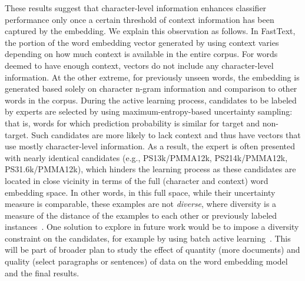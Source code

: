 These results suggest that character-level information enhances classifier performance only once a certain threshold of context information has been captured by the embedding.
We explain this observation as follows. 
In FastText, the portion of the word embedding vector generated by using context varies depending on how much context is available in the entire corpus. 
For words deemed to have enough context, vectors do not include any character-level information. 
At the other extreme, for previously unseen words, the embedding is generated based solely on character n-gram information and comparison to other words in the corpus.
During the active learning process, candidates to be labeled by experts are selected by using maximum-entropy-based uncertainty sampling: that is, words for which prediction probability is similar for target and non-target.
Such candidates are more likely to lack context
and thus have vectors that use mostly character-level information.
As a result, the expert is often presented with nearly identical candidates (e.g., PS13k/PMMA12k, PS214k/PMMA12k, PS31.6k/PMMA12k), which hinders the learning process as these candidates are located in close vicinity in terms of the full (character and context) word embedding space.
In other words, in this full space, while their uncertainty measure is comparable, these examples are not \textit{diverse}, where diversity is a measure of the distance of the examples to each other or previously labeled instances~\cite{brinker2003incorporating}.
One solution to explore in future work would be to impose a diversity constraint on the candidates,
for example by using batch active learning~\cite{settles2009active}.
This will be part of broader plan to study the effect of quantity (more documents) and quality (select paragraphs or sentences) of data on the word embedding model and the final results.


